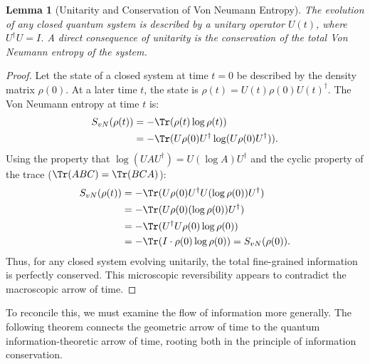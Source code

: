 \documentclass[11pt, letterpaper]{report}
\theoremstyle{plain} %
\newtheorem{lemma}[theorem]{Lemma}
\theoremstyle{definition} %
\theoremstyle{remark} %
\begin{document}
\begin{lemma}[Unitarity and Conservation of Von Neumann Entropy]
\label{lemma:unitarity_conservation}
The evolution of any closed quantum system is described by a unitary operator $U(t)$, where $U^\dagger U = I$. A direct consequence of unitarity is the conservation of the total Von Neumann entropy of the system.
\end{lemma}
\begin{proof}
Let the state of a closed system at time $t=0$ be described by the density matrix $\rho(0)$. At a later time $t$, the state is $\rho(t) = U(t)\rho(0)U(t)^\dagger$. The Von Neumann entropy at time $t$ is:
\begin{align}
    S_{vN}(\rho(t)) &= -\Tr(\rho(t) \log \rho(t)) \nonumber \\
                   &= -\Tr(U\rho(0)U^\dagger \log(U\rho(0)U^\dagger)).
\end{align}
Using the property that $\log(UAU^\dagger) = U(\log A)U^\dagger$ and the cyclic property of the trace ($\Tr(ABC)=\Tr(BCA)$):
\begin{align}
    S_{vN}(\rho(t)) &= -\Tr(U\rho(0)U^\dagger U(\log \rho(0))U^\dagger) \nonumber \\
                   &= -\Tr(U\rho(0)(\log \rho(0))U^\dagger) \nonumber \\
                   &= -\Tr(U^\dagger U \rho(0) \log \rho(0)) \nonumber \\
                   &= -\Tr(I \cdot \rho(0) \log \rho(0)) = S_{vN}(\rho(0)).
\end{align}
Thus, for any closed system evolving unitarily, the total fine-grained information is perfectly conserved. This microscopic reversibility appears to contradict the macroscopic arrow of time.
\end{proof}

To reconcile this, we must examine the flow of information more generally. The following theorem connects the geometric arrow of time to the quantum information-theoretic arrow of time, rooting both in the principle of information conservation.
\end{document}
